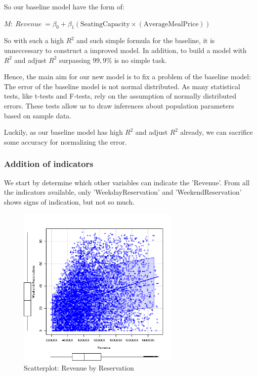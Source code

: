 So our baseline model have the form of:

\begin{center}
$
M: \ Revenue \ = \beta_0 + \beta_1 \left(\text{SeatingCapacity} \times(\text{AverageMealPrice})\right)
$
\end{center}

So with such a high $R^2$ and such simple formula for the baseline, it is unneccessary to construct a improved model. In addition, to build a model with $R^2$ and adjust $R^2$ surpassing $99,9\%$ is no simple task. 

Hence, the main aim for our new model is to fix a problem of the baseline model: The error of the baseline model is not normal distributed. As many statistical tests, like t-tests and F-tests, rely on the assumption of normally distributed errors. These tests allow us to draw inferences about population parameters based on sample data. 

Luckily, as our baseline model has high $R^2$ and adjust $R^2$ already, we can sacrifice some accuracy for normalizing the error.

\subsubsection{Addition of indicators}
We start by determine which other variables can indicate the 'Revenue'. From all the indicators available, only 'WeekdayReservation' and 'WeekendReservation' shows signs of indication, but not so much. 
\begin{figure}[H]
\centering
\includegraphics[width=0.7\textwidth]{img/scatterthat.png}
\caption{Scatterplot: Revenue by Reservation}
\label{fig:scaled_revenue_distribution_reservation}
\end{figure}

